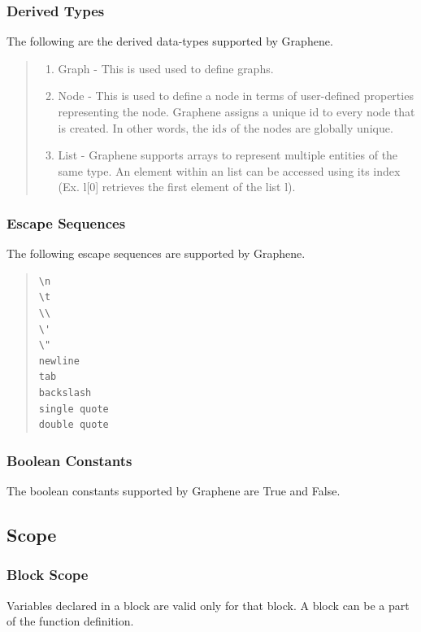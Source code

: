 \documentclass[a4paper]{article}
\begin{document}
\subsubsection{Derived Types}
The following are the derived data-types supported by Graphene.
\begin{quote}
\begin{enumerate}
\item Graph - This is used used to define graphs.
\item Node - This is used to define a node in terms of user-defined properties representing the node. Graphene assigns a unique id to every node that is created. In other words, the id$s$ of the nodes are globally unique. 
\item List - Graphene supports arrays to represent multiple entities of the same type. An element within an list can be accessed using its index (Ex. l[0] retrieves the first element of the list l).
\end{enumerate}
\end{quote}

\subsubsection{Escape Sequences}
The following escape sequences are supported by Graphene.

\begin{multicols}{2}
\begin{quote}
\begin{verbatim}
\n	
\t	
\\	
\'	
\"	
newline
tab
backslash
single quote
double quote
\end{verbatim}
\end{quote}
\end{multicols}

\subsubsection{Boolean Constants}
The boolean constants supported by Graphene are True and False.

\subsection{Scope}
\subsubsection{Block Scope}
Variables declared in a block are valid only for that block. A block can be a part of the function definition.
\end{document}

